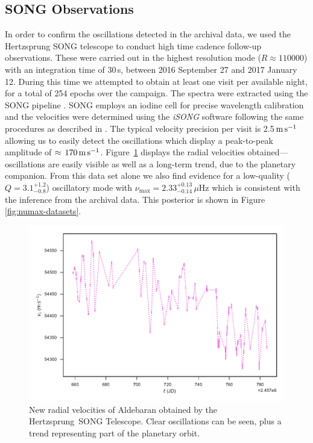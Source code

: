 \documentclass[modern]{aastex61}
\newcommand{\twosidedrange}[3]{\ensuremath{#1^{+#2}_{-#3}}}
\newcommand{\SONGQRange}{\twosidedrange{3.1}{1.2}{0.8}}
\newcommand{\SONGNuMaxRange}{\twosidedrange{2.33}{0.13}{0.14}}
\begin{document}
\subsection{SONG Observations}    %
\label{sec:SONG-observations} In order to confirm the oscillations detected in
the archival data, we used the Hertzsprung SONG telescope
\citep{2017ApJ...836..142G} to conduct high time cadence follow-up observations.
These were carried out in the highest resolution mode ($R\approx110000$) with an
integration time of 30\,s, between 2016 September 27 and 2017 January 12. During
this time we attempted to obtain at least one visit per available night, for a
total of 254 epochs over the campaign. The spectra were extracted using the SONG
pipeline \citep[see][]{2017ApJ...836..142G}. SONG employs an iodine cell for
precise wavelength calibration and the velocities were determined using the
\textit{iSONG} software following the same procedures as described in
\cite{2017ApJ...836..142G}. The typical velocity precision per visit is
2.5$\,\rm m\,s^{-1}$ allowing us to easily detect the oscillations which display
a peak-to-peak amplitude of $\approx \, 170 \, \rm m \, s^{-1}$.
Figure~\ref{songdata} displays the radial velocities obtained---oscillations
are easily visible as well as a long-term trend, due to the planetary companion.
From this data set alone we also find evidence for a low-quality ($Q =
\SONGQRange{}$) oscillatory mode with $\nu_\mathrm{max} = \SONGNuMaxRange{} \,
\mu\mathrm{Hz}$ which is consistent with the inference from the archival data.
This posterior is shown in Figure \ref{fig:numax-datasets}.


\begin{figure}
\centering
\includegraphics[width=\textwidth]{song-data.pdf}
\caption{New radial velocities of Aldebaran obtained by the Hertzsprung~SONG Telescope. Clear oscillations can be seen, plus a trend representing part of the planetary orbit.}
\label{songdata}
\end{figure}
\end{document}
